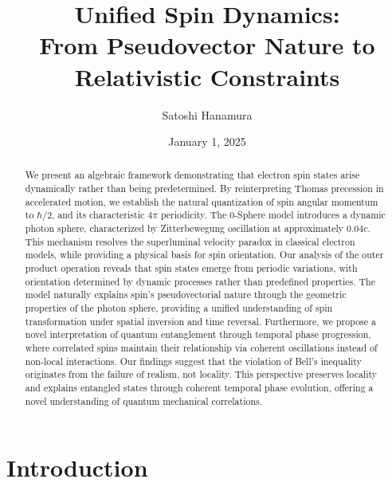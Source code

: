 \documentclass[%
 reprint,
 amsmath,amssymb,
 aps,
]{revtex4-1}
\numberwithin{equation}{section}%
\begin{document}
\title{Unified Spin Dynamics: \\From Pseudovector Nature to Relativistic Constraints}

\author{Satoshi Hanamura}
\date{January 1, 2025}

\begin{abstract}
We present an algebraic framework demonstrating that electron spin states arise dynamically rather than being predetermined. By reinterpreting Thomas precession in accelerated motion, we establish the natural quantization of spin angular momentum to $\hbar/2$, and its characteristic $4\pi$ periodicity. The 0-Sphere model introduces a dynamic photon sphere, characterized by Zitterbewegung oscillation at approximately $0.04c$. This mechanism resolves the superluminal velocity paradox in classical electron models, while providing a physical basis for spin orientation. Our analysis of the outer product operation reveals that spin states emerge from periodic variations, with orientation determined by dynamic processes rather than predefined properties. The model naturally explains spin's pseudovectorial nature through the geometric properties of the photon sphere, providing a unified understanding of spin transformation under spatial inversion and time reversal. Furthermore, we propose a novel interpretation of quantum entanglement through temporal phase progression, where correlated spins maintain their relationship via coherent oscillations instead of non-local interactions. Our findings suggest that the violation of Bell's inequality originates from the failure of realism, not locality. This perspective preserves locality and explains entangled states through coherent temporal phase evolution, offering a novel understanding of quantum mechanical correlations.
\end{abstract}


\maketitle

\section{Introduction}
\label{sec:intro}
\end{document}
